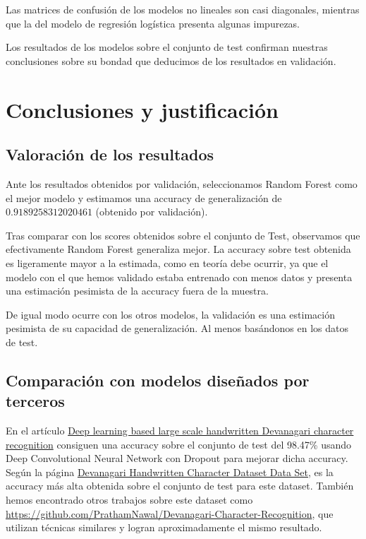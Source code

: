 \documentclass[a4]{article}
\begin{document}
Las matrices de confusión de los modelos no lineales son casi
diagonales, mientras que la del modelo de regresión logística presenta
algunas impurezas.

Los resultados de los modelos sobre el conjunto de test confirman
nuestras conclusiones sobre su bondad que deducimos de los resultados
en validación.

\section{Conclusiones y justificación}

\subsection{Valoración de los resultados}

Ante los resultados obtenidos por validación, seleccionamos Random
Forest como el mejor modelo y estimamos una accuracy de generalización
de $0.9189258312020461$ (obtenido por validación).

Tras comparar con los scores obtenidos sobre el conjunto de Test,
observamos que efectivamente Random Forest generaliza mejor. La
accuracy sobre test obtenida es ligeramente mayor a la estimada, como
en teoría debe ocurrir, ya que el modelo con el que hemos validado
estaba entrenado con menos datos y presenta una estimación pesimista
de la accuracy fuera de la muestra.

De igual modo ocurre con los otros modelos, la validación es una
estimación pesimista de su capacidad de generalización. Al menos
basándonos en los datos de test.

\subsection{Comparación con modelos diseñados por terceros}

En el artículo
\href{https://ieeexplore.ieee.org/document/7400041}{Deep learning
  based large scale handwritten Devanagari character recognition}
consiguen una accuracy sobre el conjunto de test del 98.47\% usando
Deep Convolutional Neural Network con Dropout para mejorar dicha
accuracy. Según la página
\href{https://archive.ics.uci.edu/ml/datasets/Devanagari+Handwritten+Character+Dataset}{Devanagari
  Handwritten Character Dataset Data Set}, es la accuracy más alta
obtenida sobre el conjunto de test para este dataset. También hemos
encontrado otros trabajos sobre este dataset como
\href{https://github.com/PrathamNawal/Devanagari-Character-Recognition}{https://github.com/PrathamNawal/Devanagari-Character-Recognition},
que utilizan técnicas similares y logran aproximadamente el mismo
resultado.
\end{document}
